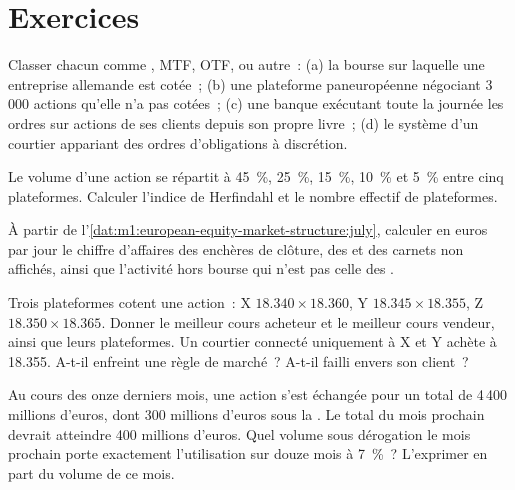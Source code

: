 \section{Exercices}

\begin{exercise}[$\star$]\label{exo:m1:european-equity-market-structure:1}
Classer chacun comme , MTF, OTF,  ou
autre~: (a) la bourse sur laquelle une entreprise allemande est cotée~; (b) une
plateforme paneuropéenne négociant 3\,000 actions qu'elle n'a pas cotées~; (c) une banque
exécutant toute la journée les ordres sur actions de ses clients depuis son propre livre~;
(d) le système d'un courtier appariant des ordres d'obligations à discrétion.
\end{exercise}

\begin{exercise}[$\star$]\label{exo:m1:european-equity-market-structure:2}
Le volume d'une action se répartit à 45~\%, 25~\%, 15~\%, 10~\% et 5~\% entre cinq plateformes.
Calculer l'indice de Herfindahl et le nombre effectif de plateformes.
\end{exercise}

\begin{exercise}[$\star$]\label{exo:m1:european-equity-market-structure:3}
À partir de l'\cref{dat:m1:european-equity-market-structure:july}, calculer en euros par
jour le chiffre d'affaires des enchères de clôture, des  et des
carnets non affichés, ainsi que l'activité hors bourse qui n'est pas celle des
.
\end{exercise}

\begin{exercise}[$\star\star$]\label{exo:m1:european-equity-market-structure:4}
Trois plateformes cotent une action~: X $18.340 \times 18.360$, Y $18.345 \times
18.355$, Z $18.350 \times 18.365$. Donner le meilleur cours acheteur et le meilleur cours vendeur, ainsi que leurs plateformes.
Un courtier connecté uniquement à X et Y achète à 18.355. A-t-il enfreint une
règle de marché~? A-t-il failli envers son client~?
\end{exercise}

\begin{exercise}[$\star\star$]\label{exo:m1:european-equity-market-structure:5}
Au cours des onze derniers mois, une action s'est échangée pour un total de 4\,400 millions d'euros, dont
300 millions d'euros sous la . Le total du mois prochain
devrait atteindre 400 millions d'euros. Quel volume sous dérogation le mois prochain porte exactement l'utilisation sur
douze mois à 7~\%~? L'exprimer en part du volume de ce
mois.
\end{exercise}

